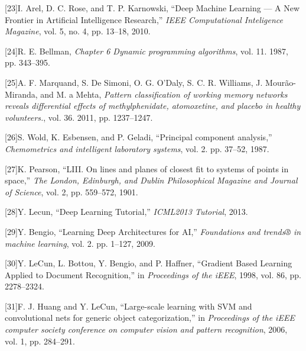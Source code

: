 {[}23{]}I. Arel, D. C. Rose, and T. P. Karnowski, ``Deep Machine
Learning --- A New Frontier in Artificial Intelligence Research,''
\emph{IEEE Computational Inteligence Magazine}, vol. 5, no. 4, pp.
13--18, 2010.

{[}24{]}R. E. Bellman, \emph{Chapter 6 Dynamic programming algorithms},
vol. 11. 1987, pp. 343--395.

{[}25{]}A. F. Marquand, S. {De Simoni}, O. G. O'Daly, S. C. R. Williams,
J. Mourão-Miranda, and M. a Mehta, \emph{Pattern classification of
working memory networks reveals differential effects of methylphenidate,
atomoxetine, and placebo in healthy volunteers.}, vol. 36. 2011, pp.
1237--1247.

{[}26{]}S. Wold, K. Esbensen, and P. Geladi, ``Principal component
analysis,'' \emph{Chemometrics and intelligent laboratory systems}, vol.
2. pp. 37--52, 1987.

{[}27{]}K. Pearson, ``LIII. On lines and planes of closest fit to
systems of points in space,'' \emph{The London, Edinburgh, and Dublin
Philosophical Magazine and Journal of Science}, vol. 2, pp. 559--572,
1901.

{[}28{]}Y. Lecun, ``Deep Learning Tutorial,'' \emph{ICML2013 Tutorial},
2013.

{[}29{]}Y. Bengio, ``Learning Deep Architectures for AI,''
\emph{Foundations and trends® in machine learning}, vol. 2. pp. 1--127,
2009.

{[}30{]}Y. LeCun, L. Bottou, Y. Bengio, and P. Haffner, ``Gradient Based
Learning Applied to Document Recognition,'' in \emph{Proceedings of the
iEEE}, 1998, vol. 86, pp. 2278--2324.

{[}31{]}F. J. Huang and Y. LeCun, ``Large-scale learning with SVM and
convolutional nets for generic object categorization,'' in
\emph{Proceedings of the iEEE computer society conference on computer
vision and pattern recognition}, 2006, vol. 1, pp. 284--291.
